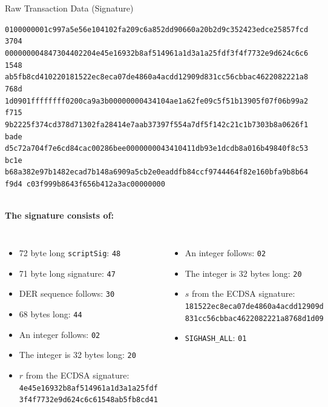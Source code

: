 \documentclass[]{beamer}
\begin{document}
\begin{frame}{Raw Transaction Data (Signature)}
	\begin{scriptsize}
\texttt{\textcolor{black!30}{0100000001c997a5e56e104102fa209c6a852dd90660a20b2d9c352423edce25857fcd3704
00000000}{\alert<2>{48}\alert<3>{47}\alert<4>{30}\alert<5>{44}\alert<6>{02}\alert<7>{20}\alert<8>{4e45e16932b8af514961a1d3a1a25fdf3f4f7732e9d624c6c61548
ab5fb8cd41}\alert<9>{02}\alert<10>{20}\alert<11>{181522ec8eca07de4860a4acdd12909d831cc56cbbac4622082221a8768d
1d09}\alert<12>{01}}\textcolor{black!30}{ffffffff0200ca9a3b00000000434104ae1a62fe09c5f51b13905f07f06b99a2f715
9b2225f374cd378d71302fa28414e7aab37397f554a7df5f142c21c1b7303b8a0626f1bade
d5c72a704f7e6cd84cac00286bee0000000043410411db93e1dcdb8a016b49840f8c53bc1e
b68a382e97b1482ecad7b148a6909a5cb2e0eaddfb84ccf9744464f82e160bfa9b8b64f9d4
c03f999b8643f656b412a3ac00000000}}
\end{scriptsize}
\vspace{1em}
\scriptsize \\
\textbf{The signature consists of:}\\
\begin{columns}[T]
\begin{itemize}
	\item \alert<2>{72 byte long \texttt{scriptSig}: \texttt{48}}
	\item \alert<3>{71 byte long signature: \texttt{47}}
	\item \alert<4>{DER sequence follows: \texttt{30}}
	\item \alert<5>{68 bytes long: \texttt{44}}
	\item \alert<6>{An integer follows: \texttt{02}}
	\item \alert<7>{The integer is 32 bytes long: \texttt{20}}
	\item \alert<8>{$r$ from the ECDSA signature: 	\texttt{4e45e16932b8af514961a1d3a1a25fdf\\3f4f7732e9d624c6c61548ab5fb8cd41}}
\end{itemize}
\begin{itemize}
	\item \alert<9>{An integer follows: \texttt{02}}
	\item \alert<10>{The integer is 32 bytes long: \texttt{20}}
	\item \alert<11>{$s$ from the ECDSA signature: \texttt{181522ec8eca07de4860a4acdd12909d\\831cc56cbbac4622082221a8768d1d09}}
	\item \alert<12>{\texttt{SIGHASH\_ALL}: \texttt{01}}
\end{itemize}
\end{columns}
\end{frame}
\end{document}
